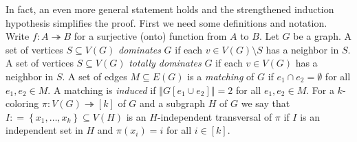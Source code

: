 \documentclass[openany]{tufte-book} %
\theoremstyle{plain}
\newcommand{\set}[1]{\left\{ #1 \right\}}
\newcommand{\size}[1]{\left\Vert#1\right\Vert}
\newcommand{\funcsurj}[3]{#1\colon #2 \twoheadrightarrow #3}
\newcommand{\irange}[1]{\left[#1\right]}
\newcommand{\DefinedAs}{\mathrel{\mathop:}=}
\begin{document}
In fact, an even more general statement holds and the strengthened induction hypothesis simplifies the proof.
First we need some definitions and notation.  
Write $\funcsurj{f}{A}{B}$ for a surjective (onto) function from $A$ to $B$.  
Let $G$ be a graph.  A set of vertices $S \subseteq V(G)$ \emph{dominates} $G$ if each $v \in V(G) \setminus S$ has a neighbor in $S$.
A set of vertices $S \subseteq V(G)$ \emph{totally dominates} $G$ if each $v \in V(G)$ has a neighbor in $S$.  A set of edges $M \subseteq E(G)$ is
a \emph{matching} of $G$ if $e_1\cap e_2 = \emptyset$ for all $e_1,e_2 \in M$.  A matching is \emph{induced} if $\size{G[e_1\cup e_2]} = 2$ for all $e_1,e_2 \in M$.
For a $k$-coloring $\funcsurj{\pi}{V(G)}{\irange{k}}$ of $G$ and a subgraph $H$ of $G$ we say 
that $I \DefinedAs \set{x_1, \ldots, x_k} \subseteq V(H)$ is an $H$-independent transversal of $\pi$ if $I$ is an independent 
set in $H$ and $\pi(x_i) = i$ for all $i \in \irange{k}$.
\end{document}
